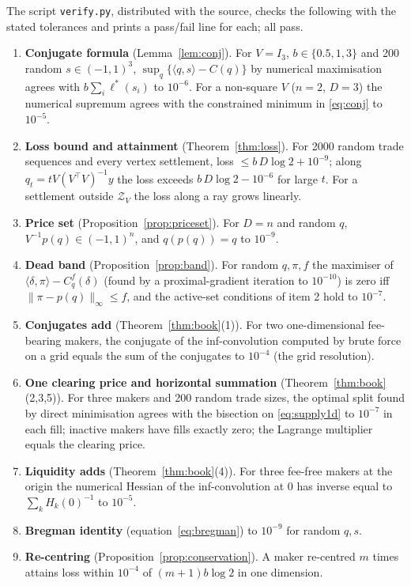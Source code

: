 \documentclass[11pt]{article}
\theoremstyle{definition}
\theoremstyle{remark}
\newcommand{\ip}[2]{\langle #1,#2\rangle}
\newcommand{\lcs}{\ell^{*}}
\newcommand{\zono}{\mathcal{Z}}
\begin{document}
The script \texttt{verify.py}, distributed with the source, checks the following with the stated tolerances and
prints a pass/fail line for each; all pass.
\begin{enumerate}[leftmargin=2em,itemsep=1pt]
\item \textbf{Conjugate formula} (Lemma~\ref{lem:conj}). For $V=I_3$, $b\in\{0.5,1,3\}$ and 200 random $s\in(-1,1)^3$,
$\sup_q\{\ip{q}{s}-C(q)\}$ by numerical maximisation agrees with $b\sum_i\lcs(s_i)$ to $10^{-6}$. For a non-square
$V$ ($n=2$, $D=3$) the numerical supremum agrees with the constrained minimum in \eqref{eq:conj} to $10^{-5}$.

\item \textbf{Loss bound and attainment} (Theorem~\ref{thm:loss}). For 2000 random trade sequences and every vertex
settlement, loss $\le b\,D\log2+10^{-9}$; along $q_t=tV(V^{\top}V)^{-1}y$ the loss exceeds $b\,D\log2-10^{-6}$ for
large $t$. For a settlement outside $\zono_V$ the loss along a ray grows linearly.

\item \textbf{Price set} (Proposition~\ref{prop:priceset}). For $D=n$ and random $q$, $V^{-1}p(q)\in(-1,1)^{n}$, and
$q(p(q))=q$ to $10^{-9}$.

\item \textbf{Dead band} (Proposition~\ref{prop:band}). For random $q,\pi,f$ the maximiser of
$\ip{\delta}{\pi}-C^{f}_{q}(\delta)$ (found by a proximal-gradient iteration to $10^{-10}$) is zero iff
$\|\pi-p(q)\|_\infty\le f$, and the active-set conditions of item 2 hold to $10^{-7}$.

\item \textbf{Conjugates add} (Theorem~\ref{thm:book}(1)). For two one-dimensional fee-bearing makers, the conjugate
of the inf-convolution computed by brute force on a grid equals the sum of the conjugates to $10^{-4}$ (the grid resolution).

\item \textbf{One clearing price and horizontal summation} (Theorem~\ref{thm:book}(2,3,5)). For three makers and 200
random trade sizes, the optimal split found by direct minimisation agrees with the bisection on
\eqref{eq:supply1d} to $10^{-7}$ in each fill; inactive makers have fills exactly zero; the Lagrange multiplier equals
the clearing price.

\item \textbf{Liquidity adds} (Theorem~\ref{thm:book}(4)). For three fee-free makers at the origin the numerical
Hessian of the inf-convolution at $0$ has inverse equal to $\sum_kH_k(0)^{-1}$ to $10^{-5}$.

\item \textbf{Bregman identity} (equation~\eqref{eq:bregman}) to $10^{-9}$ for random $q,s$.

\item \textbf{Re-centring} (Proposition~\ref{prop:conservation}). A maker re-centred $m$ times attains loss within
$10^{-4}$ of $(m+1)b\log2$ in one dimension.
\end{enumerate}
\end{document}
